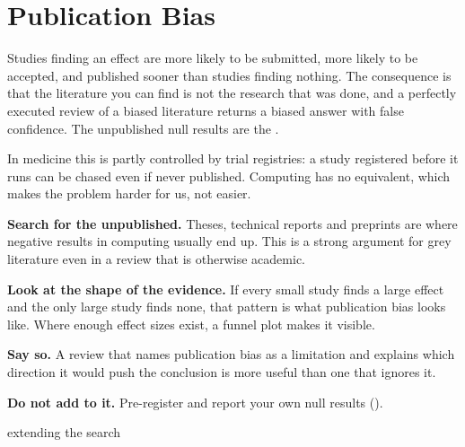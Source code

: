 \section{Publication Bias}

Studies finding an effect are more likely to be submitted, more likely to be
accepted, and published sooner than studies finding nothing. The consequence is
that the literature you can find is not the research that was done, and a
perfectly executed review of a biased literature returns a biased answer with
false confidence. The unpublished null results are the .

In medicine this is partly controlled by trial registries: a study registered
before it runs can be chased even if never published. Computing has no
equivalent, which makes the problem harder for us, not easier.

\begin{conceptbox}
\begin{tightnum}
  \item \textbf{Search for the unpublished.} Theses, technical reports and
    preprints are where negative results in computing usually end up. This is
    a strong argument for grey literature even in a review that is otherwise
    academic.
  \item \textbf{Look at the shape of the evidence.} If every small study finds
    a large effect and the only large study finds none, that pattern is what
    publication bias looks like. Where enough effect sizes exist, a funnel
    plot makes it visible.
  \item \textbf{Say so.} A review that names publication bias as a limitation
    and explains which direction it would push the conclusion is more useful
    than one that ignores it.
  \item \textbf{Do not add to it.} Pre-register and report your own null
    results ().
\end{tightnum}
\end{conceptbox}

\begin{traditions}{extending the search}
\end{traditions}

